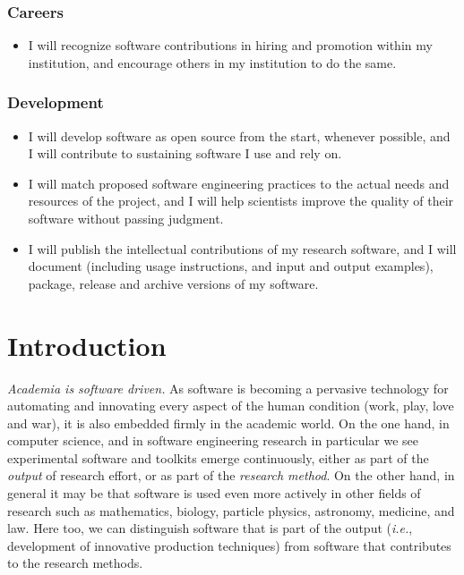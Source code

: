 \documentclass[a4paper,UKenglish]{dagman}
\renewcommand{\paragraph}[1]{\subsubsection*{#1}\xspace}
\newcommand{\ie}{\emph{i.e.},\xspace}
\begin{document}
\paragraph{Careers}
\begin{itemize}
\item I will recognize software contributions in hiring and promotion within my institution, and encourage others in my institution to do the same.
\end{itemize}

\paragraph{Development}
\begin{itemize}
\item I will develop software as open source from the start, whenever possible, and I will contribute to sustaining software I use and rely on.
\item I will match proposed software engineering practices to the actual needs and resources of the project, and I will help scientists improve the quality of their software without passing judgment.
\item I will publish the intellectual contributions of my research software, and I will document (including usage instructions, and input and output examples), package, release and archive versions of my software. 
\end{itemize}

\tableofcontents

\section{Introduction}

\emph{Academia is software driven.} As software is becoming a pervasive technology for automating and innovating every aspect of the human condition (work, play, love and war), it is also embedded firmly in the academic world. On the one hand, in computer science, and in software engineering research in particular we see experimental software and toolkits emerge continuously, either as part of the \emph{output} of research effort, or as part of the \emph{research method}. On the other hand, in general it may be that software is used even more actively in other fields of research such as mathematics, biology, particle physics, astronomy, medicine, and law. Here too, we can distinguish software that is part of the output (\ie development of innovative production techniques) from software that contributes to the research methods. 
\end{document}
